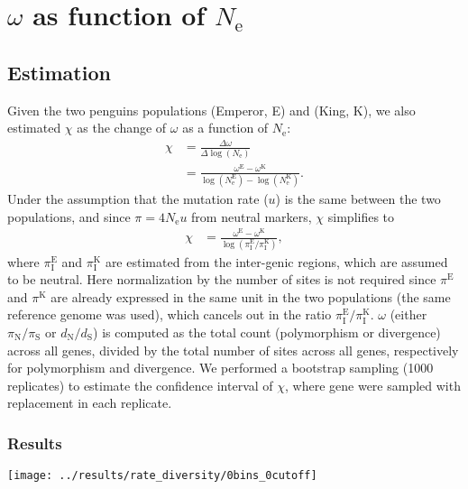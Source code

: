 \documentclass[10pt]{article}
\newcommand{\Ne}{N_{\text{e}}}
\newcommand{\dn}{d_{\text{N}}}
\newcommand{\ds}{d_{\text{S}}}
\newcommand{\dnds}{\dn / \ds}
\newcommand{\pin}{\pi_{\text{N}}}
\newcommand{\pis}{\pi_{\text{S}}}
\newcommand{\pinpis}{\pin / \pis}
\newcommand{\piInter}{\pi_{\text{I}}}
\begin{document}
    \section{$\omega$ as function of $\Ne$}

    \subsection{Estimation}
    Given the two penguins populations (Emperor, E) and (King, K), we also estimated $\chi$ as the change of $\omega$ as a function of $\Ne$:
    \begin{align}
        \chi & = \frac{\Delta \omega}{\Delta \log \left( \Ne \right)} \\
             & = \frac{\omega^{\text{E}} - \omega^{\text{K}}}{\log\left( \Ne^{\text{E}}\right) - \log \left(\Ne^{\text{K}}\right)}.
    \end{align}
    Under the assumption that the mutation rate ($u$) is the same between the two populations, and since $\pi = 4 \Ne u$ from neutral markers, $\chi$ simplifies to
    \begin{align}
        \chi & = \frac{\omega^{\text{E}} - \omega^{\text{K}}}{\log\left( \piInter^{\text{E}} / \piInter^{\text{K}} \right)},
    \end{align}
    where $\piInter^{\text{E}}$ and $\piInter^{\text{K}}$ are estimated from the inter-genic regions, which are assumed to be neutral.
    Here normalization by the number of sites is not required since $\pi^{\text{E}}$ and $\pi^{\text{K}}$ are already expressed in the same unit in the two populations (the same reference genome was used), which cancels out in the ratio $\piInter^{\text{E}} / \piInter^{\text{K}}$.
    $\omega$ (either $\pinpis$ or $\dnds$) is computed as the total count (polymorphism or divergence) across all genes, divided by the total number of sites across all genes, respectively for polymorphism and divergence.
    We performed a bootstrap sampling (1000 replicates) to estimate the confidence interval of $\chi$, where gene were sampled with replacement in each replicate.

    \subsubsection{Results}
    \begin{center}
        \texttt{[image: ../results/rate\_diversity/0bins\_0cutoff]}
    \end{center}
\end{document}
